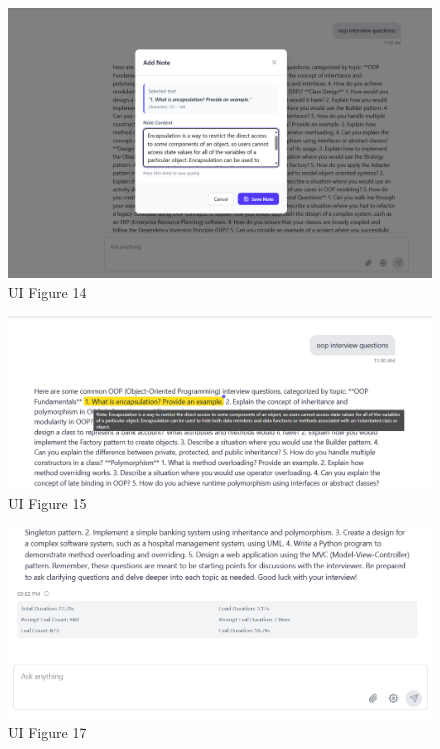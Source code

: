 \begin{figure}[p]
    \centering
    \includegraphics[width=\textwidth]{./Chapter07/figures/14.png}
    \caption{UI Figure 14}
    \label{fig:ui-figure-14}
\end{figure}
\clearpage

\begin{figure}[p]
    \centering
    \includegraphics[width=\textwidth]{./Chapter07/figures/15.png}
    \caption{UI Figure 15}
    \label{fig:ui-figure-15}
\end{figure}
\clearpage

\begin{figure}[p]
    \centering
    \includegraphics[width=\textwidth]{./Chapter07/figures/17.png}
    \caption{UI Figure 17}
    \label{fig:ui-figure-17}
\end{figure}
\clearpage

